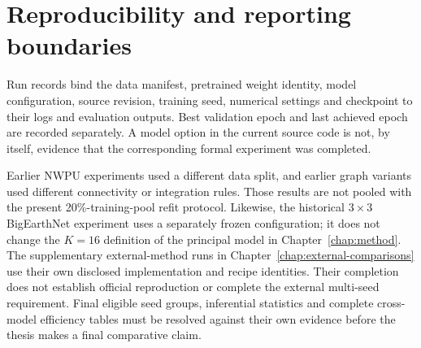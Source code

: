 \section{Reproducibility and reporting boundaries}

Run records bind the data manifest, pretrained weight identity, model
configuration, source revision, training seed, numerical settings and
checkpoint to their logs and evaluation outputs. Best validation epoch and
last achieved epoch are recorded separately. A model option in the current
source code is not, by itself, evidence that the corresponding formal
experiment was completed.

Earlier NWPU experiments used a different data split, and earlier graph
variants used different connectivity or integration rules. Those results
are not pooled with the present 20\%-training-pool refit protocol. Likewise,
the historical $3\times3$ BigEarthNet experiment uses a separately frozen
configuration; it does not change the $K=16$ definition of the principal
model in Chapter~\ref{chap:method}. The supplementary external-method runs
in Chapter~\ref{chap:external-comparisons} use their own disclosed
implementation and recipe identities. Their completion does not establish
official reproduction or complete the external multi-seed requirement.
Final eligible seed groups, inferential statistics and complete cross-model
efficiency tables must be resolved against their own evidence before the
thesis makes a final comparative claim.
